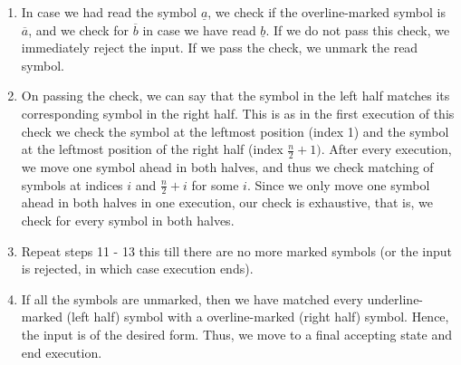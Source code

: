 \documentclass[12pt,a4paper]{article}
\begin{document}
\begin{enumerate}
    \item In case we had read the symbol $\underline{a}$, we check if the overline-marked symbol is $\overline{a}$, and we check for $\overline{b}$ in case we have read $\underline{b}$. If we do not pass this check, we immediately reject the input. If we pass the check, we unmark the read symbol.
    \item On passing the check, we can say that the symbol in the left half matches its corresponding symbol in the right half. This is as in the first execution of this check we check the symbol at the leftmost position (index 1) and the symbol at the leftmost position of the right half (index $\frac{n}{2} + 1)$. After every execution, we move one symbol ahead in both halves, and thus we check matching of symbols at indices $i$ and $\frac{n}{2} + i$ for some $i$. Since we only move one symbol ahead in both halves in one execution, our check is exhaustive, that is, we check for every symbol in both halves.
    \item Repeat steps 11 - 13 this till there are no more marked symbols (or the input is rejected, in which case execution ends).
    \item If all the symbols are unmarked, then we have matched every underline-marked (left half) symbol with a overline-marked (right half) symbol. Hence, the input is of the desired form. Thus, we move to a final accepting state and end execution.
\end{enumerate}
\end{document}
